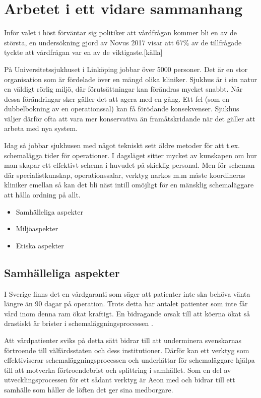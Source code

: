 \section{Arbetet i ett vidare sammanhang}
Inför valet i höst förväntar sig politiker att vårdfrågan kommer bli en av de största, en undersökning gjord av Novus 2017 visar att 67\% av de tillfrågade tyckte att vårdfrågan var en av de viktigaste.[källa]

På Universitetssjukhuset i Linköping jobbar över 5000 personer. Det är en stor organisation som är fördelade över en mängd olika kliniker. Sjukhus är i sin natur en väldigt rörlig miljö, där förutsättningar kan förändras mycket snabbt. När dessa förändringar sker gäller det att agera med en gång. Ett fel (som en dubbelbokning av en operationssal) kan få förödande konsekvenser. Sjukhus väljer därför ofta att vara mer konservativa än framåtskridande när det gäller att arbeta med nya system.

Idag så jobbar sjukhusen med något tekniskt sett äldre metoder för att t.ex. schemalägga tider för operationer. I dagsläget sitter mycket av kunskapen om hur man skapar ett effektivt schema i huvudet på skicklig personal. Men för scheman där specialistkunskap, operationssalar, verktyg narkos m.m måste koordineras kliniker emellan så kan det bli näst intill omöjligt för en mänsklig schemaläggare att hålla ordning på allt.

\begin{itemize}
\item Samhälleliga aspekter
\item Miljöaspekter
\item Etiska aspekter
\end{itemize}

\subsection{Samhälleliga aspekter}

I Sverige finns det en vårdgaranti som säger att patienter inte ska behöva vänta längre än 90 dagar på operation. Trots detta har antalet patienter som inte får vård inom denna ram ökat kraftigt. En bidragande orsak till att köerna ökat så drastiskt är brister i schemaläggningsprocessen \cite{vardko}. 

Att vårdpatienter sviks på detta sätt bidrar till att underminera svenskarnas förtroende till välfärdsstaten och dess institutioner. Därför kan ett verktyg som effektiviserar schemaläggningsprocessen och underlättar för schemaläggare hjälpa till att motverka förtroendebrist och splittring i samhället. Som en del av utvecklingsprocessen för ett sådant verktyg är Aeon med och bidrar till ett samhälle som håller de löften det ger sina medborgare.
 